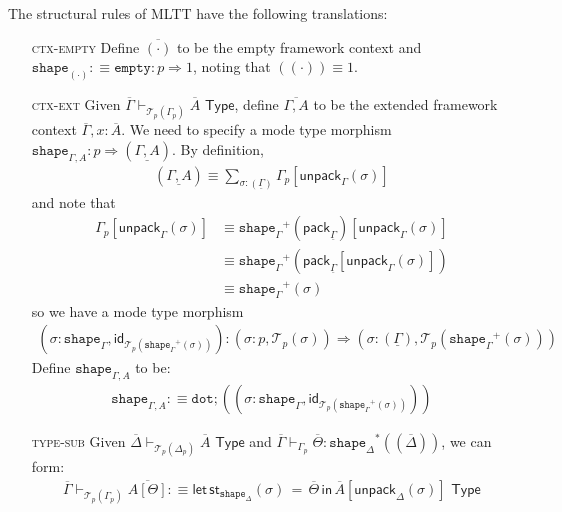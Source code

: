 \documentclass[10pt]{article}
\theoremstyle{definition}
\newcommand{\yields}{\vdash}
\newcommand{\tcell}{\Rightarrow}
\newcommand{\TYPE}{\,\,\mathsf{Type}}
\newcommand{\sigmacl}[3]{\ensuremath{(#1{:}#2,#3)}}
\newcommand{\id}{\mathsf{id}}
\newcommand\St[2]{\ensuremath{{#1}^*(#2)}}
\newcommand\StI[2]{\ensuremath{\mathsf{st}_{#1}(#2)}}
\newcommand\StE[4]{\ensuremath{\mathsf{let} \, \StI{#1}{#3} \, = \, {#2} \, \mathsf{in} \, #4}}
\newcommand\TrPlus[2]{\ensuremath{{#1}^+(#2)}}
\newcommand\El[2]{\mathcal{T}_{#1}(#2)}
\newcommand\ctxtuple[1]{(#1)}
\newcommand\pack[1]{\ensuremath{\mathsf{pack}_{#1}}}
\newcommand\unpack[2]{\ensuremath{\mathsf{unpack}_{#1}(#2)}}
\newcommand{\modeof}[1]{{#1}_p}
\newcommand{\tdot}{\ensuremath{\mathtt{dot}}}
\newcommand{\tempty}{\ensuremath{\mathtt{empty}}}
\newcommand{\tshape}[1]{\ensuremath{\mathtt{shape}_{#1}}}
\newcommand{\upstairs}[1]{\overline{#1}}
\newcommand{\downstairs}[1]{\underline{#1}}
\begin{document}
The structural rules of MLTT have the following translations:
\begin{enumerate}
\item[\textsc{ctx-empty}] Define $\upstairs{(\cdot)}$ to be the empty framework context and $\tshape{(\cdot)} :\equiv \tempty : p \tcell 1$, noting that $\ctxtuple{(\cdot)} \equiv 1$.

\item[\textsc{ctx-ext}] Given $\upstairs{\Gamma}
  \yields_{\El{p}{\modeof{\Gamma}}} \upstairs{A} \TYPE$, define $\upstairs{\Gamma, A}$ to be the extended framework context $\upstairs{\Gamma}, x : \upstairs{A}$. We need to specify a mode type morphism $\tshape{\Gamma, A} : p \tcell \ctxtuple{\downstairs{\Gamma, A}}$. 
  By definition,
  \begin{align*}
    \ctxtuple{\downstairs{\Gamma, A}} \equiv \sum_{\sigma : \ctxtuple{\downstairs{\Gamma}}} \modeof{\Gamma}[\unpack{\Gamma}{\sigma}]
  \end{align*}
  and note that 
  \begin{align*}
  \modeof{\Gamma}[\unpack{\Gamma}{\sigma}]
  &\equiv \TrPlus{\tshape{\Gamma}}{\pack{\downstairs{\Gamma}}}[\unpack{\Gamma}{\sigma}] \\
  &\equiv \TrPlus{\tshape{\Gamma}}{\pack{\downstairs{\Gamma}}[\unpack{\Gamma}{\sigma}]} \\
  &\equiv \TrPlus{\tshape{\Gamma}}{\sigma}
  \end{align*}
  so we have a mode type morphism
  \begin{align*}
  \sigmacl{\sigma}{\tshape{\Gamma}}{\id_{\El{p}{\TrPlus{\tshape{\Gamma}}{\sigma}}}} : \sigmacl{\sigma}{p}{\El{p}{\sigma}} \tcell \sigmacl{\sigma}{\ctxtuple{\downstairs{\Gamma}}}{\El{p}{\TrPlus{\tshape{\Gamma}}{\sigma}}}
  \end{align*}
  Define $\tshape{\Gamma, A}$ to be:
  \begin{align*}
  \tshape{\Gamma, A} :\equiv \tdot ; (\sigmacl{\sigma}{\tshape{\Gamma}}{\id_{\El{p}{\TrPlus{\tshape{\Gamma}}{\sigma}}}})
  \end{align*}
  
\item[\textsc{type-sub}] Given $\upstairs{\Delta} \yields_{\El{p}{\modeof{\Delta}}} \upstairs{A} \TYPE$ and $\upstairs{\Gamma} \yields_{\modeof{\Gamma}} \upstairs{\Theta} : \St{\tshape{\Delta}}{\ctxtuple{\upstairs{\Delta}}}$, we can form:
\begin{align*}
\upstairs{\Gamma} \yields_{\El{p}{\modeof{\Gamma}}} \upstairs{A[\Theta]} :\equiv \StE{\tshape{\Delta}}{\upstairs{\Theta}}{\sigma}{\upstairs{A}[\unpack{\Delta}{\sigma}]} \TYPE
\end{align*}


\end{enumerate}
\end{document}
